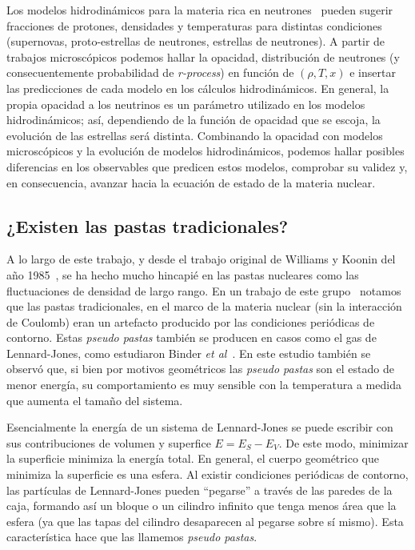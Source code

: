 Los modelos hidrodinámicos para la materia rica en neutrones~\cite{ruffert_coalescing_1995, mezzacappa_investigation_1998, geppert_temperature_2004, woosley_physics_2005, liebendorfer_supernova_2005} pueden sugerir fracciones de protones, densidades y temperaturas para distintas condiciones (supernovas, proto-estrellas de neutrones, estrellas de neutrones).
A partir de trabajos microscópicos podemos hallar la opacidad, distribución de neutrones (y consecuentemente probabilidad de \emph{r-process}) en función de $(\rho, T, x)$ e insertar las predicciones de cada modelo en los cálculos hidrodinámicos.
En general, la propia opacidad a los neutrinos es un parámetro utilizado en los modelos hidrodinámicos; así, dependiendo de la función de opacidad que se escoja, la evolución de las estrellas será distinta.
Combinando la opacidad con modelos microscópicos y la evolución de modelos hidrodinámicos, podemos hallar posibles diferencias en los observables que predicen estos modelos, comprobar su validez y, en consecuencia, avanzar hacia la ecuación de estado de la materia nuclear.


\subsection{¿Existen las pastas tradicionales?}

A lo largo de este trabajo, y desde el trabajo original de Williams y Koonin del año 1985~\cite{williams_sub-saturation_1985}, se ha hecho mucho hincapié en las pastas nucleares como las fluctuaciones de densidad de largo rango.
En un trabajo de este grupo~\cite{gimenez_molinelli_finite_2015} notamos que las pastas tradicionales, en el marco de la materia nuclear (sin la interacción de Coulomb) eran un artefacto producido por las condiciones periódicas de contorno.
Estas \emph{pseudo pastas} también se producen en casos como el gas de Lennard-Jones, como estudiaron Binder \emph{et al}~\cite{binder_beyond_2012}.
En este estudio también se observó que, si bien por motivos geométricos las \emph{pseudo pastas} son el estado de menor energía, su comportamiento es muy sensible con la temperatura a medida que aumenta el tamaño del sistema.

Esencialmente la energía de un sistema de Lennard-Jones se puede escribir con sus contribuciones de volumen y superfice $E = E_S - E_V$.
De este modo, minimizar la superficie minimiza la energía total.
En general, el cuerpo geométrico que minimiza la superficie es una esfera.
Al existir condiciones periódicas de contorno, las partículas de Lennard-Jones pueden ``pegarse'' a través de las paredes de la caja, formando así un bloque o un cilindro infinito que tenga menos área que la esfera (ya que las tapas del cilindro desaparecen al pegarse sobre sí mismo).
Esta característica hace que las llamemos \emph{pseudo pastas}.

